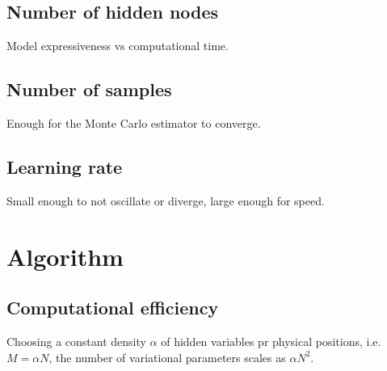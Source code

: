 \documentclass[twoside,english]{uiofysmaster}
\begin{document}
\subsection{Number of hidden nodes}
Model expressiveness vs computational time.
\subsection{Number of samples}
Enough for the Monte Carlo estimator to converge.

\subsection{Learning rate}
Small enough to not oscillate or diverge, large enough for speed.

\section{Algorithm}
\subsection{Computational efficiency}
Choosing a constant density $\alpha$ of hidden variables pr physical positions, i.e. $M=\alpha N$, the number of variational parameters scales as $\alpha N^2$.



\newpage

\end{document}
